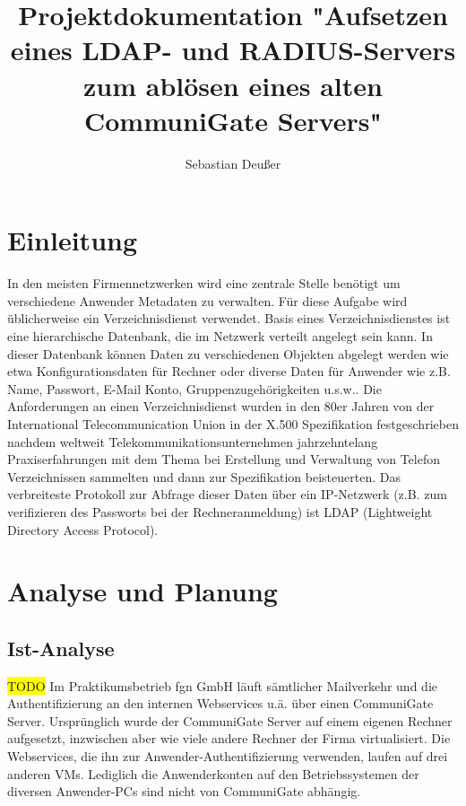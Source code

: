 \documentclass[11pt,a4paper,titlepage]{scrartcl} %
\title{Projektdokumentation "Aufsetzen eines LDAP- und RADIUS-Servers zum abl\"osen eines alten CommuniGate Servers"}
\author{Sebastian Deu\ss{}er}
\newcommand{\hilight}[1]{\colorbox{yellow}{#1}} %
\begin{document}
\maketitle %


\tableofcontents
\newpage

\section{Einleitung}
In den meisten Firmennetzwerken wird eine zentrale Stelle benötigt um verschiedene Anwender Metadaten zu verwalten. F\"ur diese Aufgabe wird \"ublicherweise ein Verzeichnisdienst verwendet. Basis eines Verzeichnisdienstes ist eine hierarchische Datenbank, die im Netzwerk verteilt angelegt sein kann. In dieser Datenbank k\"onnen Daten zu verschiedenen Objekten abgelegt werden wie etwa Konfigurationsdaten f\"ur Rechner oder diverse Daten f\"ur Anwender wie z.B. Name, Passwort, E-Mail Konto, Gruppenzugeh\"origkeiten u.s.w.. Die Anforderungen an einen Verzeichnisdienst wurden in den 80er Jahren von der International Telecommunication Union in der X.500 Spezifikation festgeschrieben nachdem weltweit Telekommunikationsunternehmen jahrzehntelang Praxiserfahrungen mit dem Thema bei Erstellung und Verwaltung von Telefon Verzeichnissen sammelten und dann zur Spezifikation beisteuerten.
Das verbreiteste Protokoll zur Abfrage dieser Daten \"uber ein IP-Netzwerk (z.B. zum verifizieren des Passworts bei der Rechneranmeldung) ist LDAP (Lightweight Directory Access Protocol).

\section{Analyse und Planung}
\subsection{Ist-Analyse}
\hilight{TODO} Im Praktikumsbetrieb fgn GmbH l\"auft s\"amtlicher Mailverkehr und die Authentifizierung an den internen Webservices u.\"a. \"uber einen CommuniGate Server. Urspr\"unglich wurde der CommuniGate Server auf einem eigenen Rechner aufgesetzt, inzwischen aber wie viele andere Rechner der Firma virtualisiert. Die Webservices, die ihn zur Anwender-Authentifizierung verwenden, laufen auf drei anderen VMs. Lediglich die Anwenderkonten auf den Betriebssystemen der diversen Anwender-PCs sind nicht von CommuniGate abh\"angig.
\end{document}
